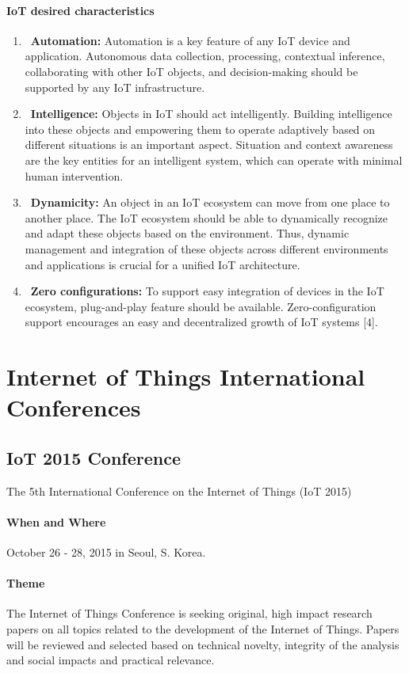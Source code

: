 \documentclass[12pt]{article}
\begin{document}
\paragraph {IoT desired characteristics}
\begin{enumerate}
\item\ \textbf {Automation:} Automation is a key feature of any IoT
device and application. Autonomous data collection, processing,
contextual inference, collaborating with other
IoT objects, and decision-making should be supported by
any IoT infrastructure.
\item\ \textbf {Intelligence:} Objects in IoT should act intelligently.
Building intelligence into these objects and empowering
them to operate adaptively based on different situations
is an important aspect. Situation and context awareness
are the key entities for an intelligent system, which can
operate with minimal human intervention.
\item\ \textbf {Dynamicity:} An object in an IoT ecosystem can move
from one place to another place. The IoT ecosystem
should be able to dynamically recognize and adapt these
objects based on the environment. Thus, dynamic management
and integration of these objects across different
environments and applications is crucial for a unified IoT
architecture.
\item\ \textbf {Zero configurations:} To support easy integration of
devices in the IoT ecosystem, plug-and-play feature
should be available. Zero-configuration support encourages
an easy and decentralized growth of IoT systems [4].
\end{enumerate}

\section{Internet of Things International Conferences}


\subsection {IoT 2015 Conference}
The 5th International Conference on the Internet of Things (IoT 2015) 


\paragraph{When and Where} October 26 - 28, 2015 in Seoul, S. Korea.

 \paragraph{Theme}The Internet of Things Conference is seeking original, high impact research papers on all topics related to the development of the Internet of Things. Papers will be reviewed and selected based on technical novelty, integrity of the analysis and social impacts and practical relevance.
\end{document}

